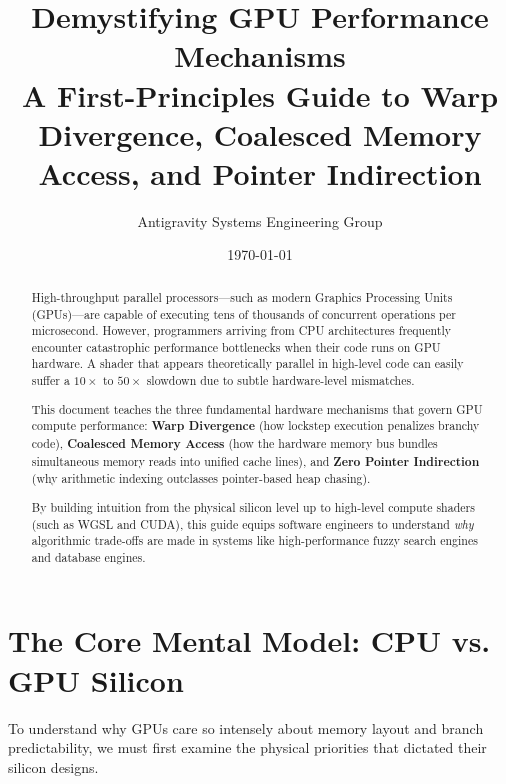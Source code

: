 \documentclass[a4paper,11pt]{article}
\title{\textbf{Demystifying GPU Performance Mechanisms}\\[0.4em]
  \large A First-Principles Guide to Warp Divergence, Coalesced Memory Access, and Pointer Indirection}
\author{Antigravity Systems Engineering Group}
\date{\today}
\begin{document}
\maketitle

\begin{abstract}
High-throughput parallel processors---such as modern Graphics Processing Units (GPUs)---are capable of executing tens of thousands of concurrent operations per microsecond. However, programmers arriving from CPU architectures frequently encounter catastrophic performance bottlenecks when their code runs on GPU hardware. A shader that appears theoretically parallel in high-level code can easily suffer a $10\times$ to $50\times$ slowdown due to subtle hardware-level mismatches.

This document teaches the three fundamental hardware mechanisms that govern GPU compute performance: \textbf{Warp Divergence} (how lockstep execution penalizes branchy code), \textbf{Coalesced Memory Access} (how the hardware memory bus bundles simultaneous memory reads into unified cache lines), and \textbf{Zero Pointer Indirection} (why arithmetic indexing outclasses pointer-based heap chasing). 

By building intuition from the physical silicon level up to high-level compute shaders (such as WGSL and CUDA), this guide equips software engineers to understand \textit{why} algorithmic trade-offs are made in systems like high-performance fuzzy search engines and database engines.
\end{abstract}

\tableofcontents
\newpage

\section{The Core Mental Model: CPU vs. GPU Silicon}

To understand why GPUs care so intensely about memory layout and branch predictability, we must first examine the physical priorities that dictated their silicon designs.
\end{document}
